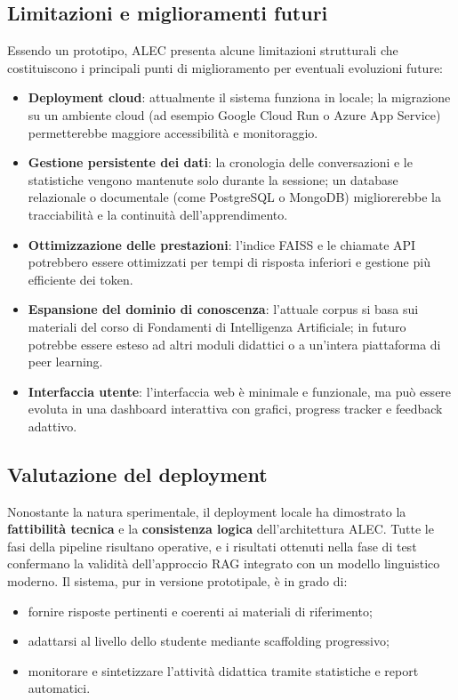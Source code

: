 \documentclass[a4paper,9pt]{article}
\begin{document}
\subsection{Limitazioni e miglioramenti futuri}

Essendo un prototipo, ALEC presenta alcune limitazioni strutturali che costituiscono i principali punti di miglioramento per eventuali evoluzioni future:
\begin{itemize}
	\item \textbf{Deployment cloud}: attualmente il sistema funziona in locale; la migrazione su un ambiente cloud (ad esempio Google Cloud Run o Azure App Service) permetterebbe maggiore accessibilità e monitoraggio.
	\item \textbf{Gestione persistente dei dati}: la cronologia delle conversazioni e le statistiche vengono mantenute solo durante la sessione; un database relazionale o documentale (come PostgreSQL o MongoDB) migliorerebbe la tracciabilità e la continuità dell’apprendimento.
	\item \textbf{Ottimizzazione delle prestazioni}: l’indice FAISS e le chiamate API potrebbero essere ottimizzati per tempi di risposta inferiori e gestione più efficiente dei token.
	\item \textbf{Espansione del dominio di conoscenza}: l’attuale corpus si basa sui materiali del corso di Fondamenti di Intelligenza Artificiale; in futuro potrebbe essere esteso ad altri moduli didattici o a un’intera piattaforma di peer learning.
	\item \textbf{Interfaccia utente}: l’interfaccia web è minimale e funzionale, ma può essere evoluta in una dashboard interattiva con grafici, progress tracker e feedback adattivo.
\end{itemize}

\subsection{Valutazione del deployment}

Nonostante la natura sperimentale, il deployment locale ha dimostrato la \textbf{fattibilità tecnica} e la \textbf{consistenza logica} dell’architettura ALEC.  
Tutte le fasi della pipeline risultano operative, e i risultati ottenuti nella fase di test confermano la validità dell’approccio RAG integrato con un modello linguistico moderno.
Il sistema, pur in versione prototipale, è in grado di:
\begin{itemize}
	\item fornire risposte pertinenti e coerenti ai materiali di riferimento;
	\item adattarsi al livello dello studente mediante scaffolding progressivo;
	\item monitorare e sintetizzare l’attività didattica tramite statistiche e report automatici.
\end{itemize}
\end{document}
